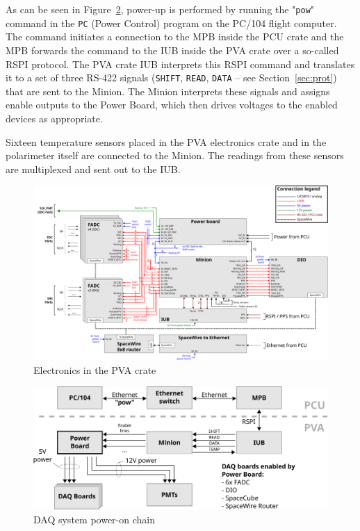 \documentclass[a4paper,11pt]{article}
\begin{document}
As can be seen in Figure~\ref{fig:pow-cmd-functioning}, power-up is performed by running 
the "\verb=pow=" command in the \verb=PC= (Power Control) program on the PC/104 flight
computer. The command initiates a connection to the MPB inside the PCU crate and the MPB 
forwards the command to the IUB inside the PVA crate over a so-called RSPI protocol. The 
PVA crate IUB interprets this RSPI command and translates it to a set of three RS-422 
signals (\verb=SHIFT=, \verb=READ=, \verb=DATA= -- see Section~\ref{sec:prot}) that are 
sent to the Minion. The Minion interprets these signals and assigns enable outputs to the 
Power Board, which then drives voltages to the enabled devices as appropriate.

Sixteen temperature sensors placed in the PVA electronics crate and in the polarimeter
itself are connected to the Minion. The readings from these sensors are multiplexed and 
sent out to the IUB.

\begin{figure}[h]
  \centerline{\includegraphics[width=\textwidth]{fig/bd-polarimeter-electronics}}
  \caption{\label{fig:bd-polarimeter-electronics} Electronics in the PVA crate}
\end{figure}

\begin{figure}[h]
  \centerline{\includegraphics[width=\textwidth]{fig/pow-cmd-functioning}}
  \caption{\label{fig:pow-cmd-functioning} DAQ system power-on chain}
\end{figure}
\end{document}
